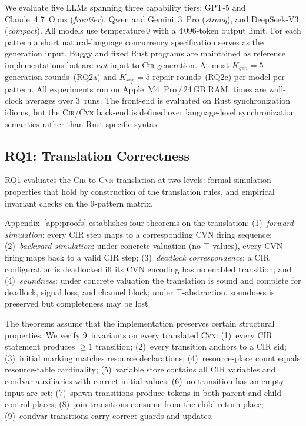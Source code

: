 \documentclass[sigconf]{acmart}
\begin{document}
We evaluate five LLMs spanning three capability tiers: GPT-5 and Claude~4.7~Opus (\emph{frontier}), Qwen and Gemini~3~Pro (\emph{strong}), and DeepSeek-V3 (\emph{compact}). All models use temperature\,0 with a 4\,096-token output limit. For each pattern a short natural-language concurrency specification serves as the generation input. Buggy and fixed Rust programs are maintained as reference implementations but are \emph{not} input to \textsc{Cir} generation. At most $K_{\mathit{gen}}=5$ generation rounds~(RQ2a) and $K_{\mathit{rep}}=5$ repair rounds~(RQ2c) per model per pattern. All experiments run on Apple~M4~Pro\,/\,24\,GB RAM; times are wall-clock averages over 3~runs. The front-end is evaluated on Rust synchronization idioms, but the \textsc{Cir}/\textsc{Cvn} back-end is defined over language-level synchronization semantics rather than Rust-specific syntax.

\subsection{RQ1: Translation Correctness}
\label{subsec:rq1}

RQ1 evaluates the \textsc{Cir}-to-\textsc{Cvn} translation at two levels: formal simulation properties that hold by construction of the translation rules, and empirical invariant checks on the 9-pattern matrix.

Appendix~\ref{app:proofs} establishes four theorems on the translation:
(1)~\emph{forward simulation}: every CIR step maps to a  corresponding CVN firing sequence;
(2)~\emph{backward simulation}: under concrete valuation (no $\top$ values), every CVN firing maps back to a
    valid CIR step;
(3)~\emph{deadlock correspondence}: a CIR configuration is deadlocked iff its CVN encoding has no enabled
    transition; and
(4)~\emph{soundness}: under concrete valuation the translation is sound and complete for deadlock, signal
    loss, and channel block; under $\top$-abstraction, soundness is preserved but completeness may be lost.

The theorems assume that the implementation preserves certain structural properties.
We verify 9~invariants on every translated \textsc{Cvn}:
(1)~every CIR statement produces $\geq 1$ transition;
(2)~every transition anchors to a CIR \textsf{sid};
(3)~initial marking matches resource declarations;
(4)~resource-place count equals resource-table cardinality;
(5)~variable store contains all CIR variables and condvar
    auxiliaries with correct initial values;
(6)~no transition has an empty input-arc set;
(7)~\textsf{spawn} transitions produce tokens in both
    parent and child control places;
(8)~\textsf{join} transitions consume from the child return
    place;
(9)~condvar transitions carry correct guards and updates.
\end{document}
